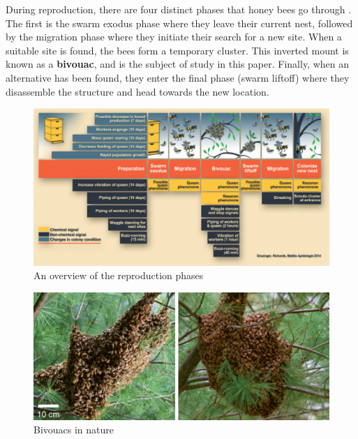 \documentclass[a4paper,10pt]{article}
\begin{document}
\begin{multicols}{2}
    During reproduction, there are four distinct phases that honey bees go through \cite{grozinger2014molecules}.
    The first is the swarm exodus phase where they leave their current nest, followed by the migration
    phase where they initiate their search for a new site. When a suitable site is found, the
    bees form a temporary cluster. This inverted mount is known as a \textbf{bivouac}, and is
    the subject of study in this paper. Finally, when an alternative has been found, they
    enter the final phase (swarm liftoff) where they disassemble the structure and head towards
    the new location.

    \begin{figure}[H]
        \centering
        \includegraphics[width=\linewidth]{phases.pdf}
        \caption{An overview of the reproduction phases \cite{grozinger2014molecules}}
    \end{figure}


    \begin{figure}[H]
        \centering
        \includegraphics[width=\linewidth]{bivouac_exmaples.pdf}
        \caption{Bivouacs in nature \cite{peleg2018collective}}
    \end{figure}


\end{multicols}
\end{document}
